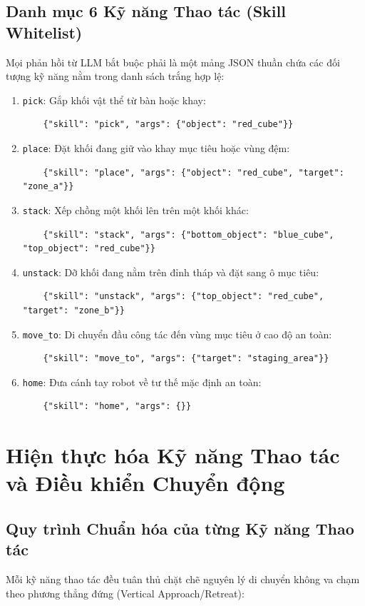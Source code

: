 \documentclass[a4paper,12pt]{article}
\begin{document}
\subsection{Danh mục 6 Kỹ năng Thao tác (Skill Whitelist)}
Mọi phản hồi từ LLM bắt buộc phải là một mảng JSON thuần chứa các đối tượng kỹ năng nằm trong danh sách trắng hợp lệ:
\begin{enumerate}
    \item \texttt{pick}: Gắp khối vật thể từ bàn hoặc khay:
    \begin{lstlisting}
    {"skill": "pick", "args": {"object": "red_cube"}}
    \end{lstlisting}
    \item \texttt{place}: Đặt khối đang giữ vào khay mục tiêu hoặc vùng đệm:
    \begin{lstlisting}
    {"skill": "place", "args": {"object": "red_cube", "target": "zone_a"}}
    \end{lstlisting}
    \item \texttt{stack}: Xếp chồng một khối lên trên một khối khác:
    \begin{lstlisting}
    {"skill": "stack", "args": {"bottom_object": "blue_cube", "top_object": "red_cube"}}
    \end{lstlisting}
    \item \texttt{unstack}: Dỡ khối đang nằm trên đỉnh tháp và đặt sang ô mục tiêu:
    \begin{lstlisting}
    {"skill": "unstack", "args": {"top_object": "red_cube", "target": "zone_b"}}
    \end{lstlisting}
    \item \texttt{move\_to}: Di chuyển đầu công tác đến vùng mục tiêu ở cao độ an toàn:
    \begin{lstlisting}
    {"skill": "move_to", "args": {"target": "staging_area"}}
    \end{lstlisting}
    \item \texttt{home}: Đưa cánh tay robot về tư thế mặc định an toàn:
    \begin{lstlisting}
    {"skill": "home", "args": {}}
    \end{lstlisting}
\end{enumerate}

\section{Hiện thực hóa Kỹ năng Thao tác và Điều khiển Chuyển động}

\subsection{Quy trình Chuẩn hóa của từng Kỹ năng Thao tác}
Mỗi kỹ năng thao tác đều tuân thủ chặt chẽ nguyên lý di chuyển không va chạm theo phương thẳng đứng (Vertical Approach/Retreat):
\end{document}
